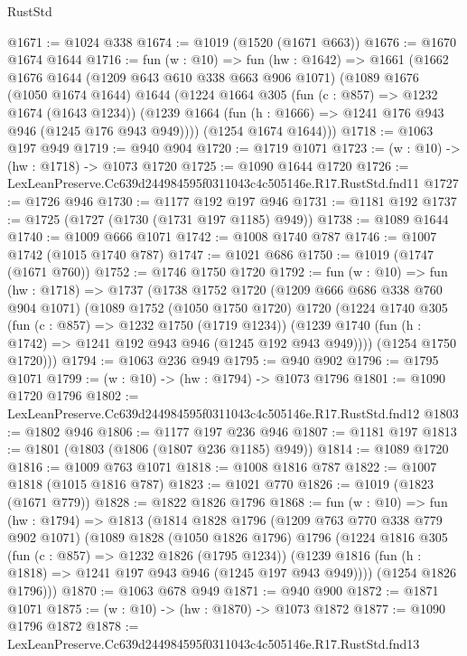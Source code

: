 \begin{lexlean}{RustStd}
\begin{coremodule}
@1671 := @1024 @338
@1674 := @1019 (@1520 (@1671 @663))
@1676 := @1670 @1674 @1644
@1716 := fun (w : @10) =>
  fun (hw : @1642) =>
  @1661
    (@1662
      @1676
      @1644
      (@1209 @643 @610 @338 @663 @906 @1071)
      (@1089
        @1676
        (@1050 @1674 @1644)
        @1644
        (@1224
          @1664
          @305
          (fun (c : @857) => @1232 @1674 (@1643 @1234))
          (@1239 @1664 (fun (h : @1666) => @1241 @176 @943 @946 (@1245 @176 @943 @949))))
        (@1254 @1674 @1644)))
@1718 := @1063 @197 @949
@1719 := @940 @904
@1720 := @1719 @1071
@1723 := (w : @10) -> (hw : @1718) -> @1073 @1720
@1725 := @1090 @1644 @1720
@1726 := LexLeanPreserve.Cc639d244984595f0311043c4c505146e.R17.RustStd.fnd11
@1727 := @1726 @946
@1730 := @1177 @192 @197 @946
@1731 := @1181 @192
@1737 := @1725 (@1727 (@1730 (@1731 @197 @1185) @949))
@1738 := @1089 @1644
@1740 := @1009 @666 @1071
@1742 := @1008 @1740 @787
@1746 := @1007 @1742 (@1015 @1740 @787)
@1747 := @1021 @686
@1750 := @1019 (@1747 (@1671 @760))
@1752 := @1746 @1750 @1720
@1792 := fun (w : @10) =>
  fun (hw : @1718) =>
  @1737
    (@1738
      @1752
      @1720
      (@1209 @666 @686 @338 @760 @904 @1071)
      (@1089
        @1752
        (@1050 @1750 @1720)
        @1720
        (@1224
          @1740
          @305
          (fun (c : @857) => @1232 @1750 (@1719 @1234))
          (@1239 @1740 (fun (h : @1742) => @1241 @192 @943 @946 (@1245 @192 @943 @949))))
        (@1254 @1750 @1720)))
@1794 := @1063 @236 @949
@1795 := @940 @902
@1796 := @1795 @1071
@1799 := (w : @10) -> (hw : @1794) -> @1073 @1796
@1801 := @1090 @1720 @1796
@1802 := LexLeanPreserve.Cc639d244984595f0311043c4c505146e.R17.RustStd.fnd12
@1803 := @1802 @946
@1806 := @1177 @197 @236 @946
@1807 := @1181 @197
@1813 := @1801 (@1803 (@1806 (@1807 @236 @1185) @949))
@1814 := @1089 @1720
@1816 := @1009 @763 @1071
@1818 := @1008 @1816 @787
@1822 := @1007 @1818 (@1015 @1816 @787)
@1823 := @1021 @770
@1826 := @1019 (@1823 (@1671 @779))
@1828 := @1822 @1826 @1796
@1868 := fun (w : @10) =>
  fun (hw : @1794) =>
  @1813
    (@1814
      @1828
      @1796
      (@1209 @763 @770 @338 @779 @902 @1071)
      (@1089
        @1828
        (@1050 @1826 @1796)
        @1796
        (@1224
          @1816
          @305
          (fun (c : @857) => @1232 @1826 (@1795 @1234))
          (@1239 @1816 (fun (h : @1818) => @1241 @197 @943 @946 (@1245 @197 @943 @949))))
        (@1254 @1826 @1796)))
@1870 := @1063 @678 @949
@1871 := @940 @900
@1872 := @1871 @1071
@1875 := (w : @10) -> (hw : @1870) -> @1073 @1872
@1877 := @1090 @1796 @1872
@1878 := LexLeanPreserve.Cc639d244984595f0311043c4c505146e.R17.RustStd.fnd13

\end{coremodule}
\end{lexlean}
